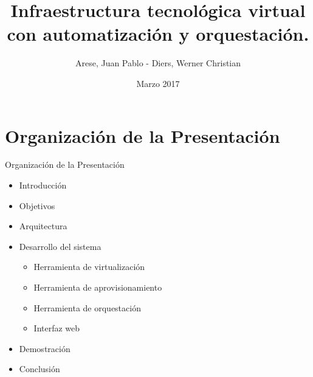 \usepackage[english]{babel}
\usepackage[utf8x]{inputenc}

\title[Your Short Title]{Infraestructura tecnológica virtual con automatización y orquestación.}
\author{Arese, Juan Pablo - Diers, Werner Christian}
\date{Marzo 2017}




\begin{frame}
  \titlepage
\end{frame}


\section{Organización de la Presentación}

\begin{frame}{Organización de la Presentación}
    \vspace{-1cm}
    \begin{itemize}
        \item Introducción
        \item Objetivos
        \item Arquitectura
        \item Desarrollo del sistema
        \begin{itemize}
            \item Herramienta de virtualización
            \item Herramienta de aprovisionamiento
            \item Herramienta de orquestación
            \item Interfaz web
        \end{itemize}
        \item Demostración
        \item Conclusión
    \end{itemize}

\end{frame}


